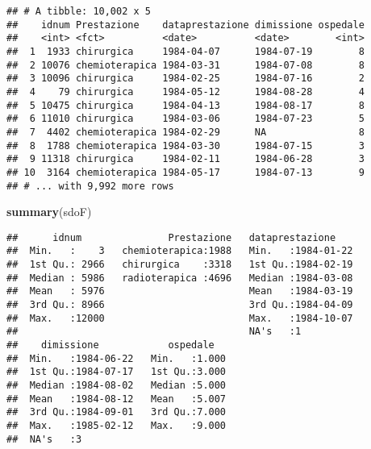 \documentclass[]{article}
\newenvironment{Shaded}{\begin{snugshade}}{\end{snugshade}}
\newcommand{\DataTypeTok}[1]{\textcolor[rgb]{0.13,0.29,0.53}{#1}}
\newcommand{\KeywordTok}[1]{\textcolor[rgb]{0.13,0.29,0.53}{\textbf{#1}}}
\newcommand{\NormalTok}[1]{#1}
\newcommand{\OperatorTok}[1]{\textcolor[rgb]{0.81,0.36,0.00}{\textbf{#1}}}
\newcommand{\StringTok}[1]{\textcolor[rgb]{0.31,0.60,0.02}{#1}}
\begin{document}
\begin{Shaded}
\end{Shaded}

\begin{verbatim}
## # A tibble: 10,002 x 5
##    idnum Prestazione    dataprestazione dimissione ospedale
##    <int> <fct>          <date>          <date>        <int>
##  1  1933 chirurgica     1984-04-07      1984-07-19        8
##  2 10076 chemioterapica 1984-03-31      1984-07-08        8
##  3 10096 chirurgica     1984-02-25      1984-07-16        2
##  4    79 chirurgica     1984-05-12      1984-08-28        4
##  5 10475 chirurgica     1984-04-13      1984-08-17        8
##  6 11010 chirurgica     1984-03-06      1984-07-23        5
##  7  4402 chemioterapica 1984-02-29      NA                8
##  8  1788 chemioterapica 1984-03-30      1984-07-15        3
##  9 11318 chirurgica     1984-02-11      1984-06-28        3
## 10  3164 chemioterapica 1984-05-17      1984-07-13        9
## # ... with 9,992 more rows
\end{verbatim}

\begin{Shaded}
\begin{Highlighting}[]
\KeywordTok{summary}\NormalTok{(sdoF)}
\end{Highlighting}
\end{Shaded}

\begin{verbatim}
##      idnum               Prestazione   dataprestazione     
##  Min.   :    3   chemioterapica:1988   Min.   :1984-01-22  
##  1st Qu.: 2966   chirurgica    :3318   1st Qu.:1984-02-19  
##  Median : 5986   radioterapica :4696   Median :1984-03-08  
##  Mean   : 5976                         Mean   :1984-03-19  
##  3rd Qu.: 8966                         3rd Qu.:1984-04-09  
##  Max.   :12000                         Max.   :1984-10-07  
##                                        NA's   :1           
##    dimissione            ospedale    
##  Min.   :1984-06-22   Min.   :1.000  
##  1st Qu.:1984-07-17   1st Qu.:3.000  
##  Median :1984-08-02   Median :5.000  
##  Mean   :1984-08-12   Mean   :5.007  
##  3rd Qu.:1984-09-01   3rd Qu.:7.000  
##  Max.   :1985-02-12   Max.   :9.000  
##  NA's   :3
\end{verbatim}
\end{document}
